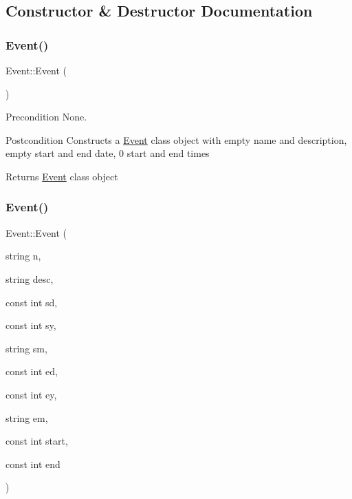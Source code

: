 \subsection{Constructor \& Destructor Documentation}
\hypertarget{class_event_a5a40dd4708297f7031e29b39e039ae10}{}\label{class_event_a5a40dd4708297f7031e29b39e039ae10} 
\subsubsection{\texorpdfstring{Event()}{Event()}\hspace{0.1cm}{\footnotesize\ttfamily [1/2]}}
{\footnotesize\ttfamily Event\+::\+Event (\begin{DoxyParamCaption}{ }\end{DoxyParamCaption})}

\begin{DoxyPrecond}{Precondition}
None. 
\end{DoxyPrecond}
\begin{DoxyPostcond}{Postcondition}
Constructs a \hyperlink{class_event}{Event} class object with empty name and description, empty start and end date, 0 start and end times 
\end{DoxyPostcond}
\begin{DoxyReturn}{Returns}
\hyperlink{class_event}{Event} class object 
\end{DoxyReturn}
\hypertarget{class_event_a088c99ca9fead1b2cff15db869c56a7a}{}\label{class_event_a088c99ca9fead1b2cff15db869c56a7a} 
\subsubsection{\texorpdfstring{Event()}{Event()}\hspace{0.1cm}{\footnotesize\ttfamily [2/2]}}
{\footnotesize\ttfamily Event\+::\+Event (\begin{DoxyParamCaption}\item[{string}]{n,  }\item[{string}]{desc,  }\item[{const int}]{sd,  }\item[{const int}]{sy,  }\item[{string}]{sm,  }\item[{const int}]{ed,  }\item[{const int}]{ey,  }\item[{string}]{em,  }\item[{const int}]{start,  }\item[{const int}]{end }\end{DoxyParamCaption})}

